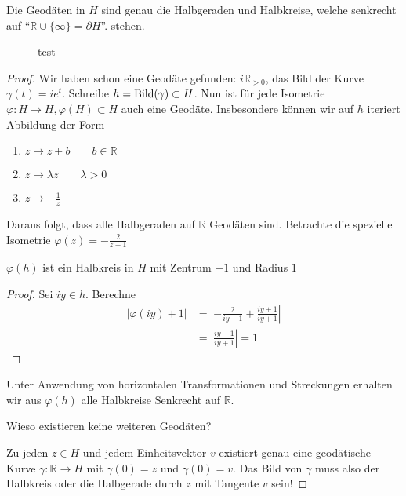 \documentclass[../main.tex]{subfiles}
\begin{document}
\begin{proposition}
    Die Geodäten in $H$ sind genau die Halbgeraden und Halbkreise, welche senkrecht auf ``$\mathbb{R} \cup \{\infty \} = \partial H$''.
    stehen. 
\end{proposition}

\begin{figure}[htb]
    \centering
    \def\svgwidth{20em}
    
    \caption{test}        
\end{figure}

\begin{proof}
    Wir haben schon eine Geodäte gefunden:
    $i \mathbb{R}_{>0} $, das Bild der Kurve $\gamma (t) = ie^t$.
    Schreibe $h = \operatorname{Bild} (\gamma) \subset H$. Nun ist für jede Isometrie
    $\varphi : H \to H, \varphi (H) \subset H$ auch eine Geodäte. Insbesondere
    können wir auf $h$ iteriert Abbildung der Form
    \begin{enumerate}
        \item $z \mapsto z + b \qquad b \in \mathbb{R}$
        \item $z \mapsto \lambda z \qquad \lambda > 0$
        \item $z \mapsto -\frac{1}{z}$
    \end{enumerate}
    Daraus folgt, dass alle Halbgeraden auf $\mathbb{R}$ Geodäten sind.
    Betrachte die spezielle Isometrie $\varphi (z)=-\frac{2}{z+1}$
    \begin{claim}
        $\varphi (h)$ ist ein Halbkreis in $H$ mit Zentrum $-1$ und Radius $1$
    \end{claim}
    \begin{proof}
        Sei $i y \in h$. Berechne
        \begin{align*}
            |\varphi(iy)+1| &= \left| -\frac{2}{iy+1} + \frac{iy+1}{iy+1} \right| \\
            &= \left| \frac{iy -1}{iy+1} \right| = 1
        \end{align*}
    \end{proof}
    Unter Anwendung von horizontalen Transformationen und Streckungen erhalten wir aus $\varphi(h)$
    alle Halbkreise Senkrecht auf $\mathbb{R}$.

    \begin{question}
        Wieso existieren keine weiteren Geodäten?
    \end{question}
    Zu jeden $z \in H$ und jedem Einheitsvektor $v$ existiert genau eine geodätische Kurve $\gamma : \mathbb{R} \to H$
    mit $\gamma (0) = z$ und $\dot{\gamma} (0) = v$. Das Bild von $\gamma$ muss also der Halbkreis
    oder die Halbgerade durch $z$ mit Tangente $v$ sein!
\end{proof}
\end{document}
